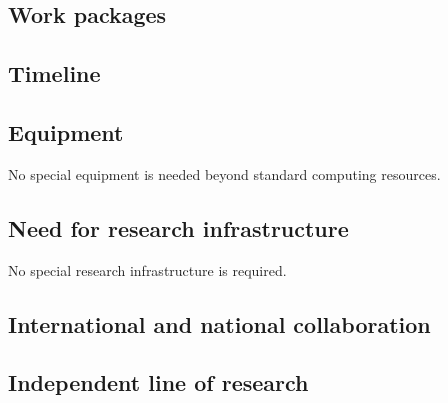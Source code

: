 \documentclass{kaw}
\begin{document}

\subsection{Work packages}


\subsection{Timeline}


\subsection{Equipment}

No special equipment is needed beyond standard computing resources.

\subsection{Need for research infrastructure}

No special research infrastructure is required.

\subsection{International and national collaboration}


\subsection{Independent line of research}


\label{lastpage}



\end{document}
